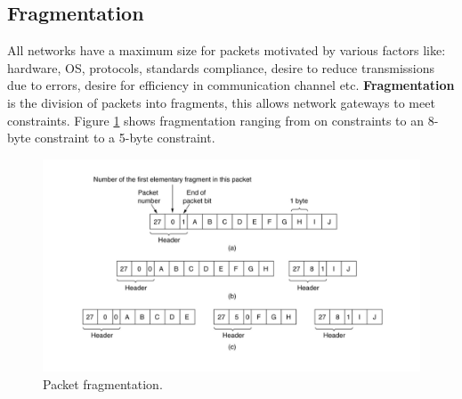 \documentclass[twoside]{article}
\begin{document}
\subsection{Fragmentation}
All networks have a maximum size for packets motivated by various factors like:
hardware, OS, protocols, standards compliance, desire to reduce transmissions 
due to errors, desire for efficiency in communication channel etc. 
\textbf{Fragmentation} is the division of packets into fragments, this allows
network gateways to meet constraints. Figure \ref{fig:frag} shows fragmentation
ranging from on constraints to an 8-byte constraint to a 5-byte constraint.
\begin{figure}
  \includegraphics[width=\linewidth]{frag.png}
  \caption{Packet fragmentation.}
  \label{fig:frag}
\end{figure}
\end{document}
